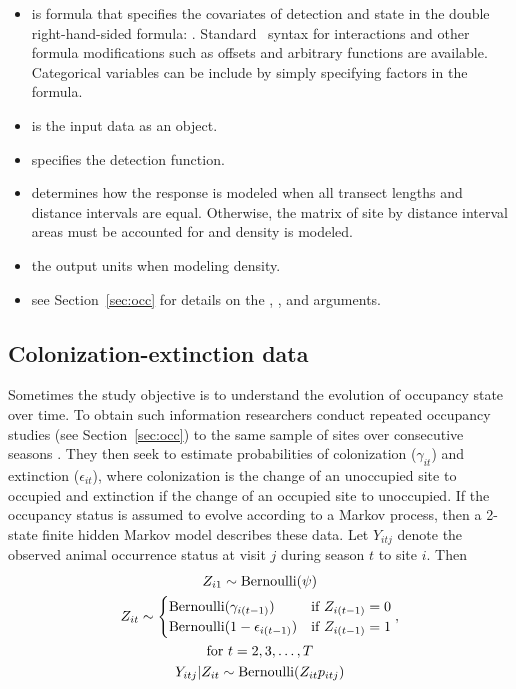 \documentclass[article,shortnames]{jss}
\DeclareMathOperator{\Bern}{Bernoulli}
\newcommand{\rlang}{\proglang{R}}
\begin{document}
\begin{itemize}
    \item {} is formula that specifies the covariates of
        detection and state in the double right-hand-sided formula: .  Standard \rlang\ syntax for
        interactions and other formula modifications such as offsets and
        arbitrary functions are available.  Categorical variables can be
        include by simply specifying factors in the formula.
    \item {} is the input data as an
         object.
    \item {} specifies the detection function.
    \item {} determines how the response is modeled when all
        transect lengths and distance intervals are equal. Otherwise, 
        the matrix of site by distance interval areas must be accounted for
        and density is modeled.
    \item {} the output units when modeling density.
    \item see Section~\ref{sec:occ} for details on the ,
      , and  arguments.
  \end{itemize}
  
  \subsection{Colonization-extinction data}

Sometimes the study objective is to understand the evolution of
occupancy state over time.  To obtain such information researchers conduct 
repeated occupancy studies (see Section~\ref{sec:occ}) to the same sample of 
sites over consecutive seasons \citep{MacKenzie2003}.  They then seek to estimate
probabilities of colonization ($\gamma_{it}$) and extinction
($\epsilon_{it}$), where colonization is the change of an unoccupied
site to occupied and extinction if the change of an occupied site to
unoccupied.  If the occupancy status is assumed to evolve according to
a Markov process, then a 2-state finite hidden Markov model describes
these data.  Let $Y_{itj}$ denote the observed animal occurrence
status at visit $j$ during season $t$ to site $i$.  Then
\begin{gather}
  Z_{i1} \sim \Bern(\psi) \\
  Z_{it} \sim
  \begin{cases}
    \Bern(\gamma_{i(t-1)}) & \text{if $Z_{i(t-1)} = 0$} \\
    \Bern(1-\epsilon_{i(t-1)}) & \text{if $Z_{i(t-1)} = 1$}
  \end{cases}, \\
  \text{for $t=2,3,\dots,T$} \notag \\
  Y_{itj} | Z_{it} \sim \Bern(Z_{it} p_{itj})
\end{gather}
\end{document}
